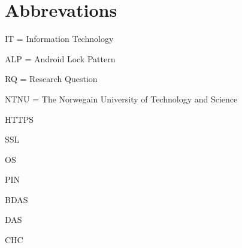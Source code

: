 \section*{Abbrevations}

	IT = Information Technology

	ALP = Android Lock Pattern
	
	RQ = Research Question

	NTNU = The Norwegain University of Technology and Science

	HTTPS

	SSL 

	OS

	PIN
	
	BDAS

	DAS

	CHC

	
